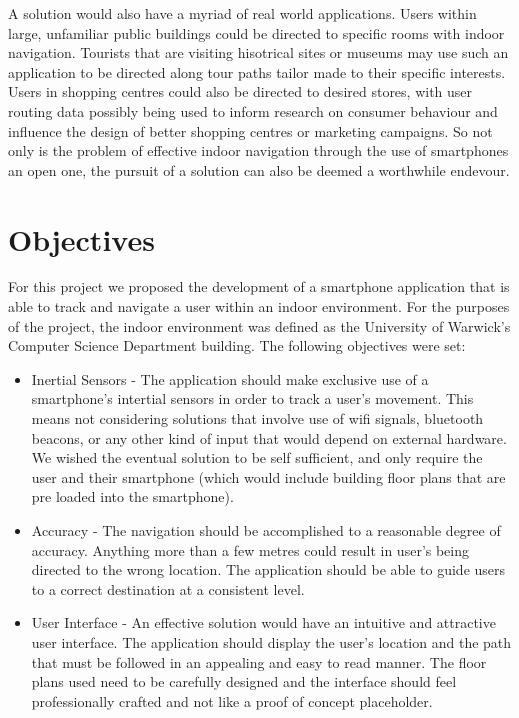 \documentclass[main.tex]{subfiles}
\begin{document}
A solution would also have a myriad of real world applications. Users within large, unfamiliar public buildings could be directed to specific rooms with indoor navigation. Tourists that are visiting hisotrical sites or museums may use such an application to be directed along tour paths tailor made to their specific interests. Users in shopping centres could also be directed to desired stores, with user routing data possibly being used to inform research on consumer behaviour and influence the design of better shopping centres or marketing campaigns. So not only is the problem of effective indoor navigation through the use of smartphones an open one, the pursuit of a solution can also be deemed a worthwhile endevour.

\section{Objectives}

For this project we proposed the development of a smartphone application that is able to track and navigate a user within an indoor environment. For the purposes of the project, the indoor environment was defined as the University of Warwick's Computer Science Department building. The following objectives were set:\\

\begin{itemize}
\item Inertial Sensors - The application should make exclusive use of a smartphone's intertial sensors in order to track a user's movement. This means not considering solutions that involve use of wifi signals, bluetooth beacons, or any other kind of input that would depend on external hardware. We wished the eventual solution to be self sufficient, and only require the user and their smartphone (which would include building floor plans that are pre loaded into the smartphone).

\item Accuracy - The navigation should be accomplished to a reasonable degree of accuracy. Anything more than a few metres could result in user's being directed to the wrong location. The application should be able to guide users to a correct destination at a consistent level.

\item User Interface - An effective solution would have an intuitive and attractive user interface. The application should display the user's location and the path that must be followed in an appealing and easy to read manner. The floor plans used need to be carefully designed and the interface should feel professionally crafted and not like a proof of concept placeholder.

\end{itemize}
\end{document}
